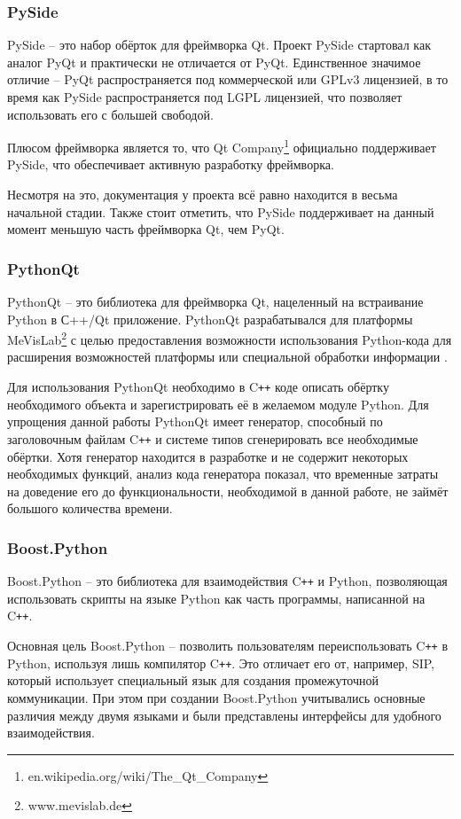 \documentclass[14pt]{matmex-diploma-custom}
\begin{document}
\subsubsection{PySide}
PySide -- это набор обёрток для фреймворка Qt. Проект PySide стартовал как аналог PyQt и практически не отличается от PyQt. Единственное значимое отличие -- PyQt распространяется под коммерческой или GPLv3 лицензией, в то время как PySide распространяется под LGPL лицензией, что позволяет использовать его с большей свободой. 

Плюсом фреймворка является то, что Qt Company\footnote{en.wikipedia.org/wiki/The\_Qt\_Company} официально поддерживает PySide, что обеспечивает активную разработку фреймворка. 

Несмотря на это, документация у проекта всё равно находится в весьма начальной стадии. Также стоит отметить, что PySide поддерживает на данный момент меньшую часть фреймворка Qt, чем PyQt.

\subsubsection{PythonQt}
PythonQt -- это библиотека для фреймворка Qt, нацеленный на встраивание Python в С++/Qt приложение. PythonQt разрабатывался для платформы MeVisLab\footnote{www.mevislab.de} с целью предоставления возможности использования Python-кода для расширения возможностей платформы или специальной обработки информации \cite{heckelMeVisLab}. 

Для использования PythonQt необходимо в C\texttt{++} коде описать обёртку необходимого объекта и зарегистрировать её в желаемом модуле Python. Для упрощения данной работы PythonQt имеет генератор, способный по заголовочным файлам C\texttt{++} и системе типов сгенерировать все необходимые обёртки. Хотя генератор находится в разработке и не содержит некоторых необходимых функций, анализ кода генератора показал, что временные затраты на доведение его до функциональности, необходимой в данной работе, не займёт большого количества времени.

\subsubsection{Boost.Python}
Boost.Python \cite{abrahams2003boost} -- это библиотека для взаимодействия C\texttt{++} и Python, позволяющая использовать скрипты на языке Python как часть программы, написанной на C\texttt{++}. 

Основная цель Boost.Python -- позволить пользователям переиспользовать C\texttt{++} в Python, используя лишь компилятор C\texttt{++}. Это отличает его от, например, SIP, который использует специальный язык для создания промежуточной коммуникации. При этом при создании Boost.Python учитывались основные различия между двумя языками и были представлены интерфейсы для удобного взаимодействия.
\end{document}
